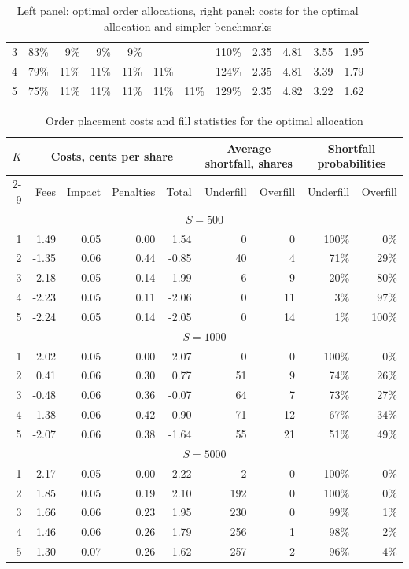 \documentclass[opre,nonblindrev]{informs3}
\begin{document}
\begin{table}[!h]
\begin{center}
\begin{tabular}{|r|r r r r r r r|r r r r|}
3 & 83\% & 9\% & 9\% & 9\% &  &  & 110\% & 2.35 & 4.81 & 3.55 & 1.95\\

4 & 79\% & 11\% & 11\% & 11\% & 11\% &  & 124\% & 2.35 & 4.81 & 3.39 & 1.79\\

5 & 75\% & 11\% & 11\% & 11\% & 11\% & 11\% & 129\% & 2.35 & 4.82 & 3.22 & 1.62\\
\hline
\end{tabular}
\normalsize
\vskip 4pt
\caption{Left panel: optimal order allocations, right panel: costs for the optimal allocation and simpler benchmarks}
\end{center}
\end{table}


\begin{table}[!h]
\begin{center}
\small
\begin{tabular}{|r|r r r r|r r|r r|}
\hline
\multirow{2}{*}{$K$} & \multicolumn{4}{|c|}{Costs, cents per share} & \multicolumn{2}{|c|}{Average shortfall, shares} & \multicolumn{2}{|c|}{Shortfall probabilities}\\
\cline{2-9}
 & Fees & Impact & Penalties & Total & Underfill & Overfill & Underfill & Overfill\\
\hline
\multicolumn{9}{|c|}{$S=500$}\\
\hline
1 & 1.49 & 0.05 & 0.00 & 1.54 & 0 & 0 & 100\% & 0\%\\
2 & -1.35 & 0.06 & 0.44 & -0.85 & 40 & 4 & 71\% & 29\%\\
3 & -2.18 & 0.05 & 0.14 & -1.99 & 6 & 9 & 20\% & 80\%\\
4 & -2.23 & 0.05 & 0.11 & -2.06 & 0 & 11 & 3\% & 97\%\\
5 & -2.24 & 0.05 & 0.14 & -2.05 & 0 & 14 & 1\% & 100\%\\
\hline
\multicolumn{9}{|c|}{$S=1000$}\\
\hline
1 & 2.02 & 0.05 & 0.00 & 2.07 & 0 & 0 & 100\% & 0\%\\
2 & 0.41 & 0.06 & 0.30 & 0.77 & 51 & 9 & 74\% & 26\%\\
3 & -0.48 & 0.06 & 0.36 & -0.07 & 64 & 7 & 73\% & 27\%\\
4 & -1.38 & 0.06 & 0.42 & -0.90 & 71 & 12 & 67\% & 34\%\\
5 & -2.07 & 0.06 & 0.38 & -1.64 & 55 & 21 & 51\% & 49\%\\
\hline
\multicolumn{9}{|c|}{$S=5000$}\\
\hline
1 & 2.17 & 0.05 & 0.00 & 2.22 & 2 & 0 & 100\% & 0\%\\
2 & 1.85 & 0.05 & 0.19 & 2.10 & 192 & 0 & 100\% & 0\%\\
3 & 1.66 & 0.06 & 0.23 & 1.95 & 230 & 0 & 99\% & 1\%\\
4 & 1.46 & 0.06 & 0.26 & 1.79 & 256 & 1 & 98\% & 2\%\\
5 & 1.30 & 0.07 & 0.26 & 1.62 & 257 & 2 & 96\% & 4\%\\
\hline
\end{tabular}
\normalsize
\vskip 4pt
\caption{Order placement costs and fill statistics for the optimal allocation}
\end{center}
\end{table}
\end{document}
